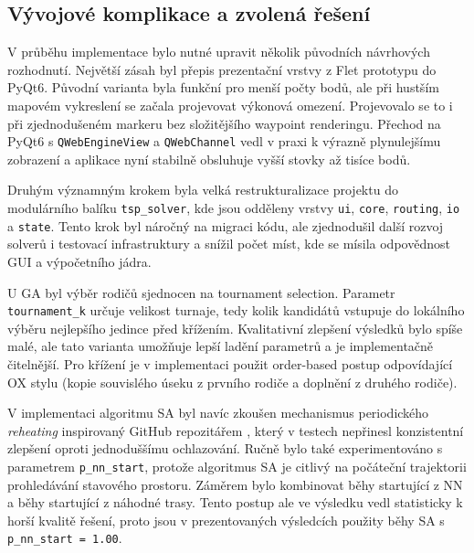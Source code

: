 

\subsection{Vývojové komplikace a zvolená řešení}
V průběhu implementace bylo nutné upravit několik původních návrhových rozhodnutí. Největší zásah byl přepis prezentační vrstvy z Flet prototypu do PyQt6. Původní varianta byla funkční pro menší počty bodů, ale při hustším mapovém vykreslení se začala projevovat výkonová omezení. Projevovalo se to i při zjednodušeném markeru bez složitějšího waypoint renderingu. Přechod na PyQt6 s \texttt{QWebEngineView} a \texttt{QWebChannel} vedl v praxi k výrazně plynulejšímu zobrazení a aplikace nyní stabilně obsluhuje vyšší stovky až tisíce bodů.

Druhým významným krokem byla velká restrukturalizace projektu do modulárního balíku \texttt{tsp\_solver}, kde jsou odděleny vrstvy \texttt{ui}, \texttt{core}, \texttt{routing}, \texttt{io} a \texttt{state}. Tento krok byl náročný na migraci kódu, ale zjednodušil další rozvoj solverů i testovací infrastruktury a snížil počet míst, kde se mísila odpovědnost GUI a výpočetního jádra.

U GA byl výběr rodičů sjednocen na tournament selection. Parametr \texttt{tournament\_k} určuje velikost turnaje, tedy kolik kandidátů vstupuje do lokálního výběru nejlepšího jedince před křížením. Kvalitativní zlepšení výsledků bylo spíše malé, ale tato varianta umožňuje lepší ladění parametrů a je implementačně čitelnější. Pro křížení je v implementaci použit order-based postup odpovídající OX stylu (kopie souvislého úseku z prvního rodiče a doplnění z druhého rodiče).

V implementaci algoritmu SA byl navíc zkoušen mechanismus periodického \emph{reheating} inspirovaný GitHub repozitářem \cite{aaronyw_atsp_py}, který v testech nepřinesl konzistentní zlepšení oproti jednoduššímu ochlazování. Ručně bylo také experimentováno s parametrem \texttt{p\_nn\_start}, protože algoritmus SA je citlivý na počáteční trajektorii prohledávání stavového prostoru. Záměrem bylo kombinovat běhy startující z NN a běhy startující z náhodné trasy. Tento postup ale ve výsledku vedl statisticky k horší kvalitě řešení, proto jsou v prezentovaných výsledcích použity běhy SA s \texttt{p\_nn\_start = 1.00}.

